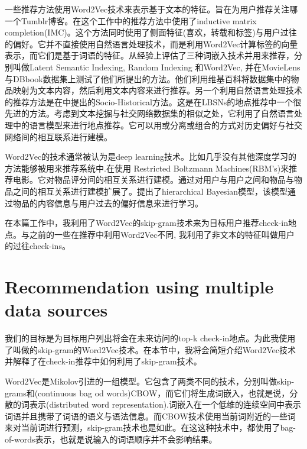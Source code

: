 \documentclass[UTF8]{ctexart}
\begin{document}
	一些推荐方法\cite{shin2014recommending,musto1441word}使用Word2Vec技术来表示基于文本的特征。\cite{shin2014recommending}旨在为用户推荐关注哪一个Tumblr博客。在这个工作中的推荐方法中使用了inductive matrix completion(IMC)。这个方法同时使用了侧面特征(喜欢，转载和标签)与用户过往的偏好。它并不直接使用自然语言处理技术，而是利用Word2Vec计算标签的向量表示，而它们是基于词语的特征。\cite{musto1441word}从经验上评估了三种词嵌入技术并用来推荐，分别叫做Latent Semantic Indexing, Random Indexing 和Word2Vec, 并在MovieLens与DBbook数据集上测试了他们所提出的方法。他们利用维基百科将数据集中的物品映射为文本内容，然后利用文本内容来进行推荐。另一个利用自然语言处理技术的推荐方法是在\cite{gao2012exploring}中提出的Socio-Historical方法。这是在LBSNs的地点推荐中一个很先进的方法。考虑到文本挖掘与社交网络数据集的相似之处，它利用了自然语言处理中的语言模型来进行地点推荐。它可以用或分离或组合的方式对历史偏好与社交网络间的相互联系进行建模。
	
	Word2Vec的技术通常被认为是deep learning技术。比如\cite{salakhutdinov2007restricted,georgiev2013non,wang2015collaborative}几乎没有其他深度学习的方法能够被用来推荐系统中.在\cite{salakhutdinov2007restricted}使用 Restricted Boltzmann Machines(RBM's)来推荐电影。它对物品评分间的相互关系进行建模。\cite{georgiev2013non}通过对用户与用户之间和物品与物品之间的相互关系进行建模扩展了\cite{salakhutdinov2007restricted}。\cite{wang2015collaborative}提出了hierarchical Bayesian模型，该模型通过物品的内容信息与用户过去的偏好信息来进行学习。
	
	在本篇工作中，我利用了Word2Vec的skip-gram技术来为目标用户推荐check-in地点。与之前的一些在推荐中利用Word2Vec\cite{shin2014recommending,musto1441word}不同, 我利用了非文本的特征叫做用户的过往check-ins。
	
	
	\section{Recommendation using multiple data sources}
	我们的目标是为目标用户列出将会在未来访问的top-k check-in地点。为此我使用了叫做的skip-gram的Word2Vec技术。在本节中，我将会简短介绍Word2Vec技术并解释了在check-in推荐中如何利用了skip-gram技术。
	
	Word2Vec是Mikolov\cite{mikolov2013distributed,mikolov2013efficient}引进的一组模型。它包含了两类不同的技术，分别叫做skip-grams和(continuous bag od words)CBOW，而它们将生成词嵌入，也就是说，分散的词表示(distributed word representation).词嵌入在一个低维的连续空间中表示词语并且携带了词语的语义与语法信息\cite{li2015word}。而CBOW技术使用当前词附近的一些词来对当前词进行预测，skip-gram技术也是如此。在这这种技术中，都使用了bag-of-words表示，也就是说输入的词语顺序并不会影响结果。
	
\end{document}
